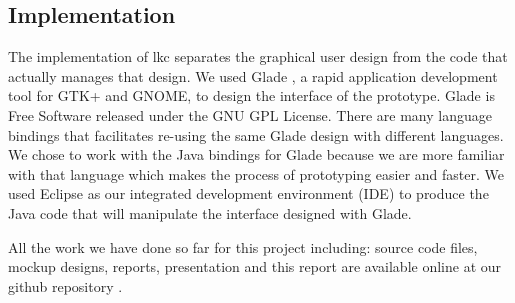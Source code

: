 \documentclass{chi2009}
\begin{document}
\subsection{Implementation}
The implementation of \textsf{lkc} separates the graphical user design from the code that actually manages that design. We used Glade \cite{glade:2010}, a rapid
application development tool for GTK+ and GNOME, to design the interface of the prototype. Glade is Free Software released under the GNU GPL License. There are
many language bindings that facilitates re-using the same Glade design with different languages. We chose to work with the Java bindings for Glade
\cite{java-gnome:2010} because we are more familiar with that language which makes the process of prototyping easier and faster. We used Eclipse
\cite{eclipse:2010} as our integrated development environment (IDE) to produce the Java code that will manipulate the interface designed with Glade.

All the work we have done so far for this project including: source code files, mockup designs, reports, presentation and this report are available online at
our github repository \cite{git-lkc:2010}.
\end{document}

